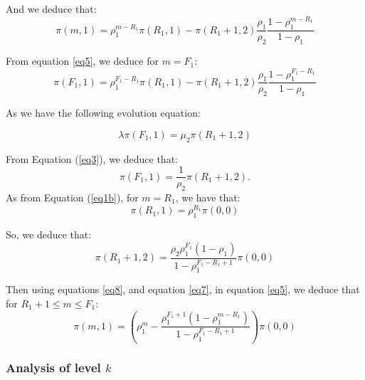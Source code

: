 \documentclass[conference]{IEEEtran}
\begin{document}
\noindent And we deduce that:
\begin{equation}
\pi(m,1)=\rho_1^{m-R_1} \pi(R_1,1)-\pi(R_1+1,2)\frac{\rho_1}{\rho_2}\frac{1-\rho_1^{m-R_1}}{1-\rho_1}  \label{eq5}
\end{equation}

\noindent From equation \ref{eq5}, we deduce for $m=F_1$:
\begin{equation}
\pi(F_1,1)=\rho_1^{F_1-R_1} \pi(R_1,1)-\pi(R_1+1,2)\frac{\rho_1}{\rho_2}\frac{1-\rho_1^{F_1-R_1}}{1-\rho_1} \label{eq6}
\end{equation}

\noindent As we have the following evolution equation:

\begin{equation}
\lambda \pi(F_1,1) = \mu_2 \pi(R_1+1,2) \label{eq3}
\end{equation}



\noindent From Equation (\ref{eq3}), we deduce that:
 $$\pi(F_1,1)=\frac{1}{\rho_2} \pi(R_1+1,2).$$
\noindent As  from Equation (\ref{eq1b}), for $m=R_1$, we have that:
\begin{equation}
\pi(R_1,1)=\rho_1^{R_1} \pi(0,0)
\label{eq8}
\end{equation}

\noindent So, we deduce that:
\begin{equation}
\pi(R_1+1,2)= \frac{\rho_2 \rho_1^{F_1} (1-\rho_1)}{1-\rho_1^{F_1-R_1+1}}\pi(0,0)
\label{eq7}
\end{equation}



\noindent Then using equations \ref{eq8}, and equation \ref{eq7}, in equation \ref{eq5}, we deduce that
for $R_1+1 \leq m \leq  F_1$:
\begin{equation}
\pi(m,1)=(\rho_1^{m}- \frac{\rho_1^{F_1+1} (1-\rho_1^{m-R_1})} {1-\rho_1^{F_1-R_1+1}}) \pi(0,0)
\label{eq1c}
\end{equation}




\subsubsection{Analysis of level $k$}
\end{document}
